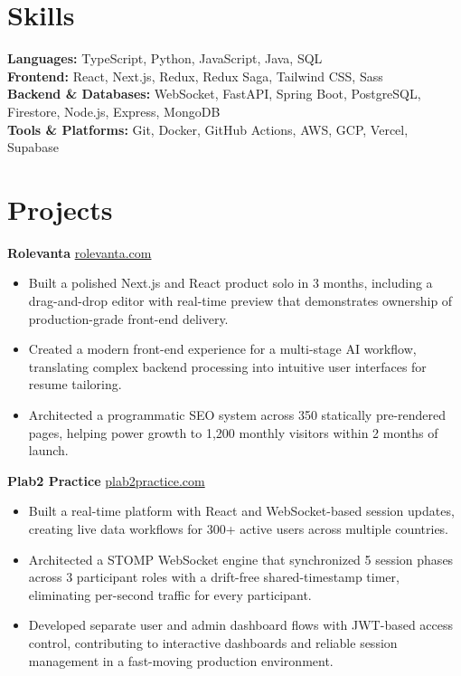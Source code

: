 \documentclass[11pt]{article}       %
\begin{document}
\vspace{-10.5pt}

\section*{Skills}
\textbf{Languages:} TypeScript, Python, JavaScript, Java, SQL \\
\textbf{Frontend:} React, Next.js, Redux, Redux Saga, Tailwind CSS, Sass \\
\textbf{Backend \& Databases:} WebSocket, FastAPI, Spring Boot, PostgreSQL, Firestore, Node.js, Express, MongoDB \\
\textbf{Tools \& Platforms:} Git, Docker, GitHub Actions, AWS, GCP, Vercel, Supabase
\vspace{-5pt}






\section*{Projects}
\textbf{Rolevanta} \hfill \href{https://rolevanta.com}{rolevanta.com} \\
\vspace{-9pt}
\begin{itemize}
  \item Built a polished Next.js and React product solo in 3 months, including a drag-and-drop editor with real-time preview that demonstrates ownership of production-grade front-end delivery.
  \item Created a modern front-end experience for a multi-stage AI workflow, translating complex backend processing into intuitive user interfaces for resume tailoring.
  \item Architected a programmatic SEO system across 350 statically pre-rendered pages, helping power growth to 1,200 monthly visitors within 2 months of launch.
\end{itemize}

\textbf{Plab2 Practice} \hfill \href{https://plab2practice.com}{plab2practice.com} \\
\vspace{-9pt}
\begin{itemize}
  \item Built a real-time platform with React and WebSocket-based session updates, creating live data workflows for 300+ active users across multiple countries.
  \item Architected a STOMP WebSocket engine that synchronized 5 session phases across 3 participant roles with a drift-free shared-timestamp timer, eliminating per-second traffic for every participant.
  \item Developed separate user and admin dashboard flows with JWT-based access control, contributing to interactive dashboards and reliable session management in a fast-moving production environment.
\end{itemize}
\end{document}
